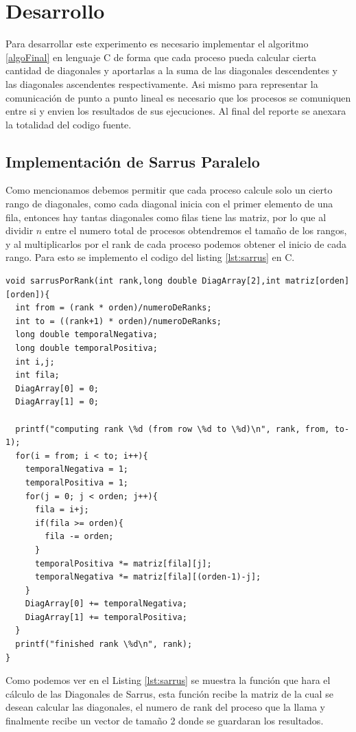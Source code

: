 \documentclass[10pt]{IEEEtran}
\begin{document}
\section{Desarrollo}
Para desarrollar este experimento es necesario implementar el algoritmo \ref{algoFinal} en lenguaje C de forma que cada proceso pueda calcular cierta cantidad de diagonales y aportarlas a la suma de las diagonales descendentes y las diagonales ascendentes respectivamente. Asi mismo para representar la comunicación de punto a punto lineal es necesario que los procesos se comuniquen entre si y envien los resultados de sus ejecuciones. Al final del reporte se anexara la totalidad del codigo fuente.

\subsection{Implementación de Sarrus Paralelo}
Como mencionamos debemos permitir que cada proceso calcule solo un cierto rango de diagonales, como cada diagonal inicia con el primer elemento de una fila, entonces hay tantas diagonales como filas tiene las matriz, por lo que al dividir $n$ entre el numero total de procesos obtendremos el tamaño de los rangos, y al multiplicarlos por el rank de cada proceso podemos obtener el inicio de cada rango. Para esto se implemento el codigo del listing \ref{lst:sarrus} en C.

\begin{lstlisting}[caption={Implementacion de Sarrus Paralelo},label={lst:sarrus}]
void sarrusPorRank(int rank,long double DiagArray[2],int matriz[orden][orden]){
  int from = (rank * orden)/numeroDeRanks;
  int to = ((rank+1) * orden)/numeroDeRanks;
  long double temporalNegativa;
  long double temporalPositiva;
  int i,j;
  int fila;
  DiagArray[0] = 0;
  DiagArray[1] = 0;

  printf("computing rank \%d (from row \%d to \%d)\n", rank, from, to-1);
  for(i = from; i < to; i++){
    temporalNegativa = 1;
    temporalPositiva = 1;
    for(j = 0; j < orden; j++){
      fila = i+j;
      if(fila >= orden){
        fila -= orden;
      }
      temporalPositiva *= matriz[fila][j];
      temporalNegativa *= matriz[fila][(orden-1)-j];
    }
    DiagArray[0] += temporalNegativa;
    DiagArray[1] += temporalPositiva;
  }
  printf("finished rank \%d\n", rank);
}
\end{lstlisting}

Como podemos ver en el Listing \ref{lst:sarrus} se muestra la función que hara el cálculo de las Diagonales de Sarrus, esta función recibe la matriz de la cual se desean calcular las diagonales, el numero de rank del proceso que la llama y finalmente recibe un vector de tamaño 2 donde se guardaran los resultados.
\end{document}
